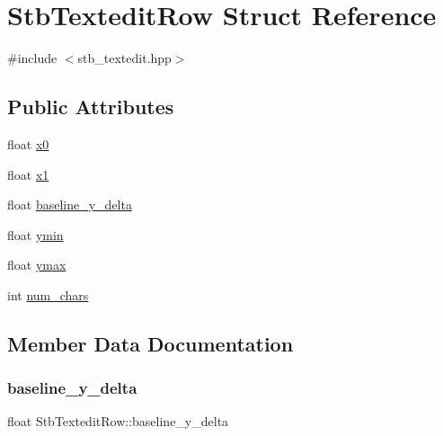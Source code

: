 \hypertarget{struct_stb_textedit_row}{}\section{Stb\+Textedit\+Row Struct Reference}
\label{struct_stb_textedit_row}


{\ttfamily \#include $<$stb\+\_\+textedit.\+hpp$>$}

\subsection*{Public Attributes}
\begin{DoxyCompactItemize}
\item 
float \hyperlink{struct_stb_textedit_row_af30b3e1d61d1acea26d3e0ebec2cb81d}{x0}
\item 
float \hyperlink{struct_stb_textedit_row_a3a3e1a506030c871a1b3d09bf26e341f}{x1}
\item 
float \hyperlink{struct_stb_textedit_row_ad2d72b74b1a61e331949c7f7ec311880}{baseline\+\_\+y\+\_\+delta}
\item 
float \hyperlink{struct_stb_textedit_row_a707d331bd9dc99d64c81f71106b75eed}{ymin}
\item 
float \hyperlink{struct_stb_textedit_row_aab290e15f6a3b4a96ab2c2472cc8a7a5}{ymax}
\item 
int \hyperlink{struct_stb_textedit_row_a1a19bebadb3f82b4f86ea29698d77084}{num\+\_\+chars}
\end{DoxyCompactItemize}


\subsection{Member Data Documentation}
\hypertarget{struct_stb_textedit_row_ad2d72b74b1a61e331949c7f7ec311880}{}\label{struct_stb_textedit_row_ad2d72b74b1a61e331949c7f7ec311880} 
\subsubsection{\texorpdfstring{baseline\+\_\+y\+\_\+delta}{baseline\_y\_delta}}
{\footnotesize\ttfamily float Stb\+Textedit\+Row\+::baseline\+\_\+y\+\_\+delta}

\hypertarget{struct_stb_textedit_row_a1a19bebadb3f82b4f86ea29698d77084}{}\label{struct_stb_textedit_row_a1a19bebadb3f82b4f86ea29698d77084} 
